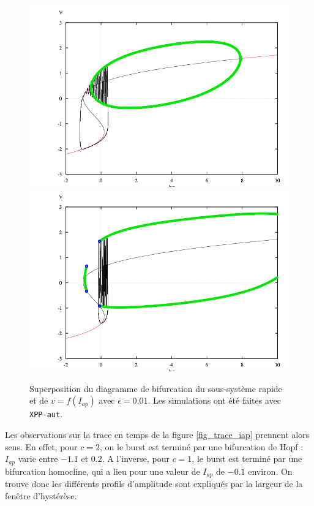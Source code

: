 \documentclass[12pt,a4paper,onecolumn]{article}
\begin{document}
\begin{figure}[H]
	\begin{center}
		\includegraphics[width = 0.9\linewidth]{superpositionC2.png} \includegraphics[width = 0.9\linewidth]{superpositionC1.png}
	\end{center}
	\caption{Superposition du diagramme de bifurcation du sous-système rapide et de $v=f(I_{ap})$ avec $\epsilon = 0.01$. Les simulations ont été faites avec \texttt{XPP-aut}.}
	\label{super_diag}
\end{figure}

Les observations sur la trace en temps de la figure \ref{fig_trace_iap} prennent alors sens. En effet, pour $c=2$, on le burst est terminé par une bifurcation de Hopf : $I_{ap}$ varie entre $-1.1$ et $0.2$. A l'inverse, pour $c=1$, le burst est terminé par une bifurcation homocline, qui a lieu pour une valeur de $I_{ap}$ de $-0.1$ environ. On trouve donc les différents profils d'amplitude sont expliqués par la largeur de la fenêtre d'hystérèse.
\end{document}
